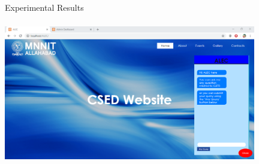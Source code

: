 \documentclass{beamer}
\begin{document}
\begin{frame}{Experimental Results}
   \includegraphics[width=11cm, height=7cm]{s1.png}
   
\end{frame}
\end{document}

